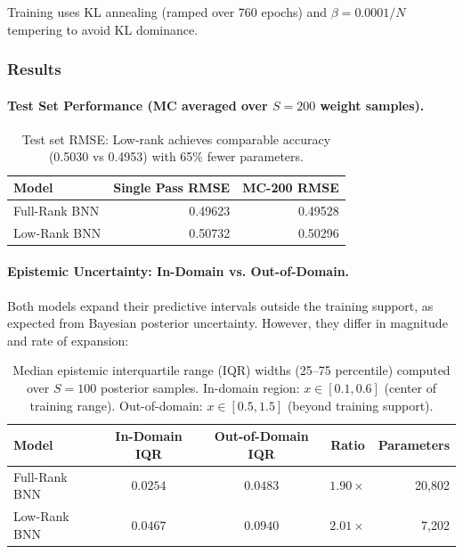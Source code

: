 \documentclass{article}
\theoremstyle{plain}
\theoremstyle{definition}
\theoremstyle{remark}
\begin{document}
Training uses KL annealing (ramped over 760 epochs) and $\beta = 0.0001/N$ tempering to avoid KL dominance.

\subsubsection{Results}

\paragraph{Test Set Performance (MC averaged over $S=200$ weight samples).}

\begin{table}[ht]
\centering
\begin{tabular}{lrr}
\toprule
\textbf{Model} & \textbf{Single Pass RMSE} & \textbf{MC-200 RMSE} \\
\midrule
Full-Rank BNN & 0.49623 & 0.49528 \\
Low-Rank BNN & 0.50732 & 0.50296 \\
\bottomrule
\end{tabular}
\caption{Test set RMSE: Low-rank achieves comparable accuracy (0.5030 vs 0.4953) with 65\% fewer parameters.}
\end{table}

\paragraph{Epistemic Uncertainty: In-Domain vs. Out-of-Domain.}

Both models expand their predictive intervals outside the training support, as expected from Bayesian posterior uncertainty. 
However, they differ in magnitude and rate of expansion:

\begin{table}[ht]
\centering
\begin{tabular}{lcccr}
\toprule
\textbf{Model} & \textbf{In-Domain IQR} & \textbf{Out-of-Domain IQR} & \textbf{Ratio} & \textbf{Parameters} \\
\midrule
Full-Rank BNN & $0.0254$ & $0.0483$ & $1.90\times$ & 20,802 \\
Low-Rank BNN & $0.0467$ & $0.0940$ & $2.01\times$ & 7,202 \\
\bottomrule
\end{tabular}
\caption{Median epistemic interquartile range (IQR) widths (25--75 percentile) computed over $S=100$ 
posterior samples. In-domain region: $x \in [0.1, 0.6]$ (center of training range). 
Out-of-domain: $x \in [0.5, 1.5]$ (beyond training support).}
\label{tab:toy_iqr}
\end{table}
\end{document}

